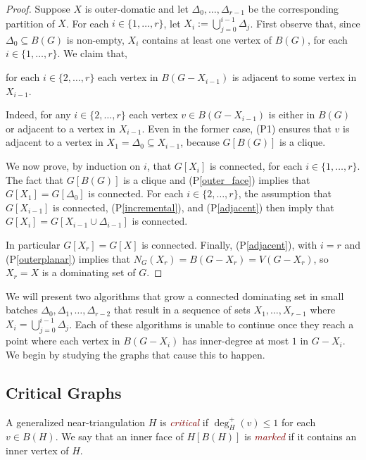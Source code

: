\documentclass[11pt]{article}
\newcommand{\pref}[1]{(P\ref{#1})}
\newcommand{\defin}[1]{\emph{\textcolor{Maroon}{#1}}}
\theoremstyle{definition}
\begin{document}
\begin{proof}
  Suppose $X$ is outer-domatic and let $\Delta_0,\ldots,\Delta_{r-1}$ be the corresponding partition of $X$.  For each $i\in\{1,\ldots,r\}$, let $X_i:=\bigcup_{j=0}^{i-1} \Delta_j$.  First observe that, since $\Delta_0\subseteq B(G)$ is non-empty, $X_i$ contains at least one vertex of $B(G)$, for each $i\in\{1,\ldots,r\}$. We claim that,
  \begin{compactenum}[(P1)]\setcounter{enumi}{3}
    \item for each $i\in\{2,\ldots,r\}$ each vertex in $B(G-X_{i-1})$ is adjacent to some vertex in $X_{i-1}$. \label{adjacent}
  \end{compactenum}
  Indeed, for any $i\in\{2,\ldots,r\}$ each vertex $v\in B(G-X_{i-1})$ is either in $B(G)$ or adjacent to a vertex in $X_{i-1}$. Even in the former case, (P1) ensures that $v$ is adjacent to a vertex in $X_1=\Delta_0\subseteq X_{i-1}$, because $G[B(G)]$ is a clique.

  We now prove, by induction on $i$, that $G[X_i]$ is connected, for each $i\in\{1,\ldots,r\}$.
  The fact that $G[B(G)]$ is a clique and \pref{outer_face} implies that $G[X_1]=G[\Delta_0]$ is connected. For each $i\in\{2,\ldots,r\}$, the assumption that $G[X_{i-1}]$ is connected, \pref{incremental}, and \pref{adjacent} then imply that $G[X_i]=G[X_{i-1}\cup\Delta_{i-1}]$ is connected.

  In particular $G[X_r]=G[X]$ is connected.  Finally, \pref{adjacent}, with $i=r$ and \pref{outerplanar} implies that $N_G(X_r)=B(G-X_r)=V(G-X_r)$, so $X_r=X$ is a dominating set of $G$.
\end{proof}

We will present two algorithms that grow a connected dominating set in small batches $\Delta_0,\Delta_1,\ldots,\Delta_{r-2}$ that result in a sequence of sets $X_1,\ldots,X_{r-1}$ where $X_{i}=\bigcup_{j=0}^{i-1}\Delta_j$.  Each of these algorithms is unable to continue once they reach a point where each vertex in $B(G-X_i)$ has inner-degree at most $1$ in $G-X_i$.  We begin by studying the graphs that cause this to happen.

\subsection{Critical Graphs}

A generalized near-triangulation $H$ is \defin{critical} if $\deg^+_H(v)\le 1$ for each $v\in B(H)$. We say that an inner face of $H[B(H)]$ is \defin{marked} if it contains an inner vertex of $H$.
\end{document}
